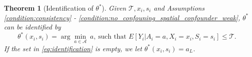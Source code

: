 \documentclass[12pt]{article}
\newtheorem{theorem}{Theorem}%
\newcommand{\CP}[1]{{\color{purple}From Chan: #1}}
\begin{document}
\begin{theorem}[Identification of $\theta^*$]\label{thm:identification}
    Given $\mathcal{T}, x_{i}, s_{i}$ and Assumptions \ref{condition:consistency} - \ref{condition:no_confouning_spatial_confounder_weak}, $\theta^*$ can be identified by
        \begin{equation}\label{eq:identification}
            \theta^*(x_i,s_i) = \arg\min_{a\in\mathcal{A}} \ a, \ \text{such that } E[Y_i|A_i=a, X_i = x_i, S_i = s_i]\leq \mathcal{T}.
        \end{equation}
If the set in \eqref{eq:identification} is empty, we let $\theta^*(x_i,s_i)=a_L$. %
\end{theorem}
\end{document}
